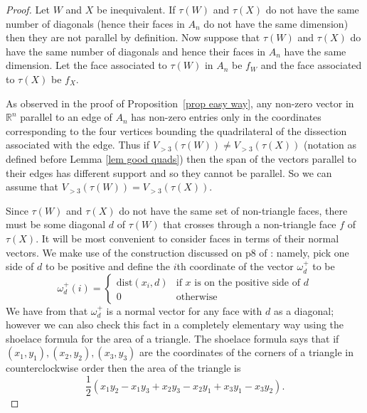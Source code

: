 \documentclass[11pt]{article}
\newcommand{\R}{\mathbb{R}}
\theoremstyle{remark}
\theoremstyle{definition}
\begin{document}
\begin{proof}
  Let $W$ and $X$ be inequivalent.  If $\tau(W)$ and $\tau(X)$ do not have the same number of diagonals (hence their faces in $A_n$ do not have the same dimension) then they are not parallel by definition. Now suppose that $\tau(W)$ and $\tau(X)$ do have the same number of diagonals and hence their faces in $A_n$ have the same dimension.  Let the face associated to $\tau(W)$ in $A_n$ be $f_W$ and the face associated to $\tau(X)$ be $f_X$.

As observed in the proof of Proposition~\ref{prop easy way}, any non-zero vector in $\R^n$ parallel to an edge of $A_n$ has non-zero entries only in the coordinates corresponding to the four vertices bounding the quadrilateral of the dissection associated with the edge.  Thus if $V_{>3}(\tau(W)) \neq V_{>3}(\tau(X))$ (notation as defined before Lemma \ref{lem good quads}) then the span of the vectors parallel to their edges has different support and so they cannot be parallel.  So we can assume that $V_{>3}(\tau(W)) = V_{>3}(\tau(X))$.

    Since $\tau(W)$ and $\tau(X)$ do not have the same set of non-triangle faces, there must be some diagonal $d$ of $\tau(W)$ that crosses through a non-triangle face $f$ of $\tau(X)$. 
    It will be most convenient to consider faces in terms of their normal vectors. We make use of the construction discussed on p8 of \cite{CSZinequivalent}: namely, pick one side of $d$ to be positive and define the $i$th coordinate of the vector $\omega^+_d$ to be
    \[
    \omega^+_d(i) = \begin{cases} \text{dist}(x_i, d) & \text{if $x$ is on the positive side of $d$}\\ 0 & \text{otherwise} \end{cases}
    \]
    We have from \cite{CSZinequivalent} that $\omega^+_d$ is a normal vector for any face with $d$ as a diagonal; however we can also check this fact in a completely elementary way using the shoelace formula for the area of a triangle.  The shoelace formula says that if $(x_1, y_1), (x_2, y_2), (x_3, y_3)$ are the coordinates of the corners of a triangle in counterclockwise order then the area of the triangle is \[\textstyle\frac{1}{2}(x_1y_2 - x_1y_3 + x_2y_3 - x_2y_1 + x_3y_1 - x_3y_2).\]


\end{proof}
\end{document}
